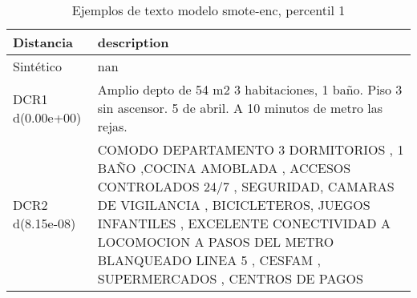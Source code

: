 \begin{table}[H]
\centering
\fontsize{10}{14}\selectfont
\caption{Ejemplos de texto modelo smote-enc, percentil 1}
\label{table-example-economicos-a-1-smote-enc-1p-text}
\begin{tabular}{|l|m{35em}|}
\hline
\rowcolor[gray]{0.8}
Distancia & description \\
\hline Sintético & nan \\
\hline DCR1 d(0.00e+00) & Amplio depto de 54 m2 3 habitaciones, 1 ba\~no. Piso 3 sin ascensor.   5 de abril. A 10 minutos de metro las rejas. \\
\hline DCR2 d(8.15e-08) & COMODO DEPARTAMENTO 3 DORMITORIOS , 1 BA\~NO ,COCINA AMOBLADA , ACCESOS CONTROLADOS 24/7 , SEGURIDAD, CAMARAS DE VIGILANCIA , BICICLETEROS, JUEGOS INFANTILES , EXCELENTE CONECTIVIDAD A LOCOMOCION A PASOS DEL METRO BLANQUEADO LINEA 5 , CESFAM , SUPERMERCADOS , CENTROS DE PAGOS \\
\hline
\end{tabular}
\end{table}
